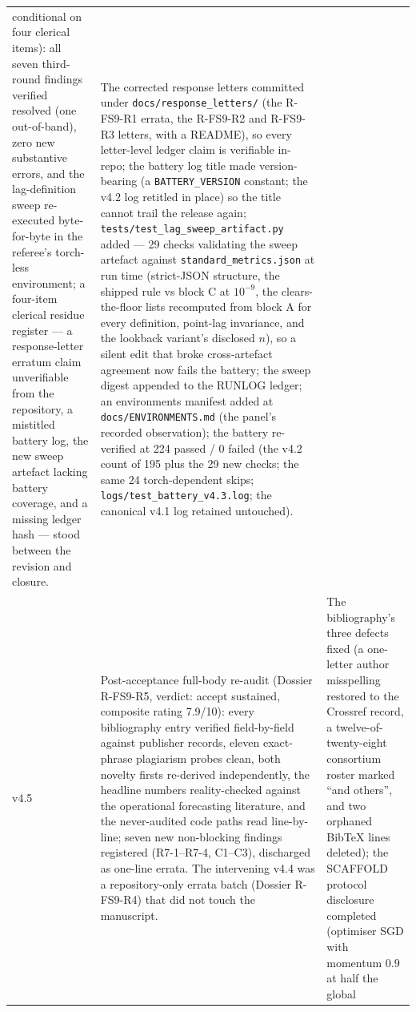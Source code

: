\begin{longtable}{@{}p{} >{\raggedright\arraybackslash}p{} >{\raggedright\arraybackslash}p{}@{}}
conditional on four clerical items): all seven third-round findings
verified resolved (one out-of-band), zero new substantive errors,
and the lag-definition sweep re-executed byte-for-byte in the
referee's torch-less environment; a four-item clerical residue
register --- a response-letter erratum claim unverifiable from the
repository, a mistitled battery log, the new sweep artefact lacking
battery coverage, and a missing ledger hash --- stood between the
revision and closure. & The corrected response letters committed
under \texttt{docs/response\_letters/} (the R-FS9-R1 errata, the
R-FS9-R2 and R-FS9-R3 letters, with a README), so every
letter-level ledger claim is verifiable in-repo; the battery log
title made version-bearing (a \texttt{BATTERY\_VERSION} constant;
the v4.2 log retitled in place) so the title cannot trail the
release again; \texttt{tests/test\_lag\_sweep\_artifact.py} added
--- 29 checks validating the sweep artefact against
\texttt{standard\_metrics.json} at run time (strict-JSON structure,
the shipped rule vs block C at $10^{-9}$, the clears-the-floor
lists recomputed from block A for every definition, point-lag
invariance, and the lookback variant's disclosed $n$), so a silent
edit that broke cross-artefact agreement now fails the battery; the
sweep digest appended to the RUNLOG ledger; an environments
manifest added at \texttt{docs/ENVIRONMENTS.md} (the panel's
recorded observation); the battery re-verified at 224 passed /
0 failed (the v4.2 count of 195 plus the 29 new checks; the same 24
torch-dependent skips; \texttt{logs/test\_battery\_v4.3.log}; the
canonical v4.1 log retained untouched). \\
\addlinespace[2pt]
v4.5 & Post-acceptance full-body re-audit (Dossier R-FS9-R5, verdict:
accept sustained, composite rating 7.9/10): every bibliography entry
verified field-by-field against publisher records, eleven exact-phrase
plagiarism probes clean, both novelty firsts re-derived independently,
the headline numbers reality-checked against the operational
forecasting literature, and the never-audited code paths read
line-by-line; seven new non-blocking findings registered (R7-1--R7-4,
C1--C3), discharged as one-line errata. The intervening v4.4 was a
repository-only errata batch (Dossier R-FS9-R4) that did not touch
the manuscript. & The bibliography's three defects fixed (a one-letter
author misspelling restored to the Crossref record, a
twelve-of-twenty-eight consortium roster marked ``and others'', and
two orphaned BibTeX lines deleted); the SCAFFOLD protocol disclosure
completed (optimiser SGD with momentum $0.9$ at half the global

\end{longtable}
